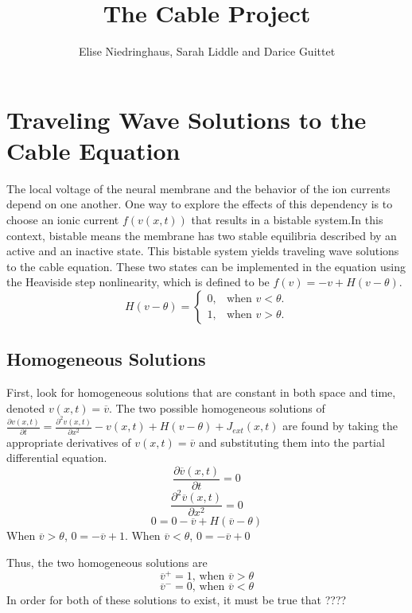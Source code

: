 \documentclass[11pt, oneside]{article}   	%
\title{The Cable Project}
\author{Elise Niedringhaus, Sarah Liddle and Darice Guittet}
\begin{document}
\maketitle
\section{Traveling Wave Solutions to the Cable Equation}
The local voltage of the neural membrane and the behavior of the ion currents depend on one another. One way to explore the effects of this dependency is to choose an ionic current $f(v(x,t))$ that results in a bistable system.In this context, bistable means the membrane has two stable equilibria described by an active and an inactive state. This bistable system yields traveling wave solutions to the cable equation. These two states can be implemented in the equation using the Heaviside step nonlinearity, which is defined to be $f(v)=-v+H(v-\theta)$.\\

\begin{equation}
  H(v-\theta)=\begin{cases}
    0, & \text{when $v<\theta$}.\\
    1, & \text{when $v>\theta$}.
  \end{cases}
\end{equation}


\subsection{Homogeneous Solutions}
First, look for homogeneous solutions that are constant in both space and time, denoted $v(x,t)=\overline{v}$. The two possible homogeneous solutions of $\frac{\partial v(x,t)}{\partial t}=\frac{\partial ^2 v(x,t)}{\partial x^2}-v(x,t)+H(v-\theta)+J_{ext}(x,t)$ are found by taking the appropriate derivatives of $v(x,t)=\overline{v}$ and substituting them into the partial differential equation. 
$$\frac{\partial \overline{v}(x,t)}{\partial t}=0$$
$$\frac{\partial ^2 \overline{v}(x,t)}{\partial x^2}=0$$
$$0=0-\overline{v}+H(\overline{v}-\theta)$$
When $\overline{v}>\theta$, $0=-\overline{v}+1$. When $\overline{v}<\theta$, $0=-\overline{v}+0$

Thus, the two homogeneous solutions are 
$$\overline{v}^+=1\text{, when $\overline{v}>\theta$}$$
$$\overline{v}^-=0\text{, when $\overline{v}<\theta$}$$
In order for both of these solutions to exist, it must be true that ????
\end{document}
